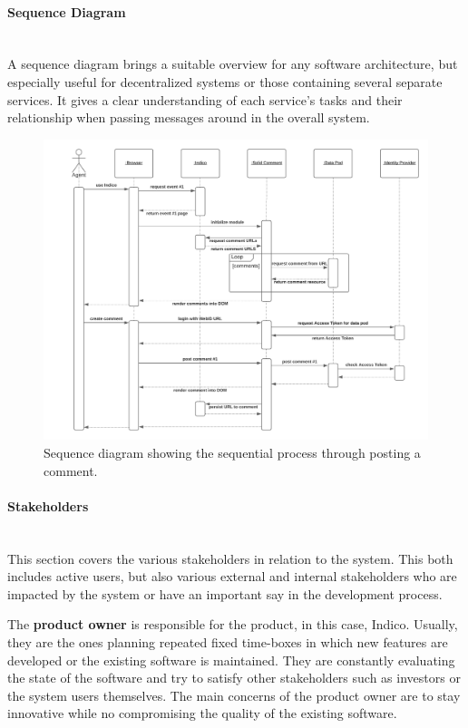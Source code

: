 \paragraph{Sequence Diagram}\mbox{}\\

A sequence diagram brings a suitable overview for any software architecture, but especially useful for decentralized systems or those containing several separate services. It gives a clear understanding of each service’s tasks and their relationship when passing messages around in the overall system.

\begin{figure}[H]
    \centering
    \includegraphics[width=\textwidth]{prototype/graphs/poc-comment-sequence_diagram.png}
    \caption{Sequence diagram showing the sequential process through posting a comment.}
    \label{fig:poc-comment-sequence_diagram}
\end{figure}

\paragraph{Stakeholders}\mbox{}\\

This section covers the various stakeholders in relation to the system. This both includes active users, but also various external and internal stakeholders who are impacted by the system or have an important say in the development process.

The \textbf{product owner} is responsible for the product, in this case, Indico. Usually, they are the ones planning repeated fixed time-boxes in which new features are developed or the existing software is maintained. They are constantly evaluating the state of the software and try to satisfy other stakeholders such as investors or the system users themselves. The main concerns of the product owner are to stay innovative while no compromising the quality of the existing software.

